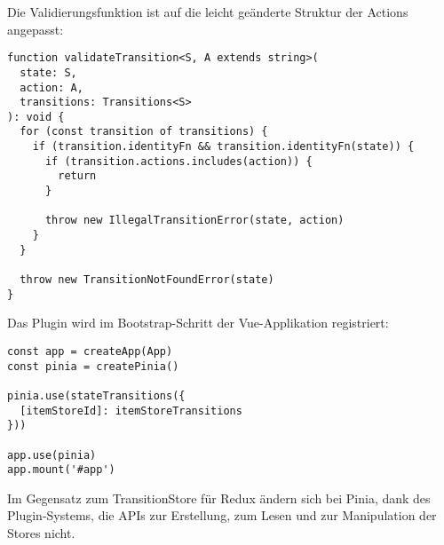 Die Validierungsfunktion ist auf die leicht geänderte Struktur der Actions angepasst:

\begin{lstlisting}
function validateTransition<S, A extends string>(
  state: S,
  action: A,
  transitions: Transitions<S>
): void {
  for (const transition of transitions) {
    if (transition.identityFn && transition.identityFn(state)) {
      if (transition.actions.includes(action)) {
        return
      }

      throw new IllegalTransitionError(state, action)
    }
  }

  throw new TransitionNotFoundError(state)
}
\end{lstlisting}

Das Plugin wird im Bootstrap-Schritt der Vue-Applikation registriert:

\begin{lstlisting}
const app = createApp(App)
const pinia = createPinia()

pinia.use(stateTransitions({
  [itemStoreId]: itemStoreTransitions
}))

app.use(pinia)
app.mount('#app')
\end{lstlisting}

Im Gegensatz zum TransitionStore für Redux ändern sich bei Pinia, dank des Plugin-Systems, die APIs zur Erstellung, zum Lesen und zur Manipulation der Stores nicht.
